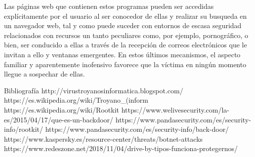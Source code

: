 		Las páginas web que contienen estos programas pueden ser accedidas explícitamente por el usuario al ser conocedor de ellas y realizar su busqueda en un navegador web, tal y como puede suceder con entornos de escasa seguridad relacionados con recursos un tanto peculiares como, por ejemplo, pornográfico, o bien, ser conducido a ellas a través de la recepción de correos electrónicos que le invitan a ello y ventanas emergentes. En estos últimos mecanismos, el aspecto familiar y aparentemente inofensivo favorece que la víctima en ningún momento llegue a sospechar de ellas.

Bibliografía
http://virustroyanosinformatica.blogspot.com/
https://es.wikipedia.org/wiki/Troyano_(inform%
https://es.wikipedia.org/wiki/Rootkit
https://www.welivesecurity.com/la-es/2015/04/17/que-es-un-backdoor/
https://www.pandasecurity.com/es/security-info/rootkit/
https://www.pandasecurity.com/es/security-info/back-door/
https://www.kaspersky.es/resource-center/threats/botnet-attacks
https://www.redeszone.net/2018/11/04/drive-by-tipos-funciona-protegernos/